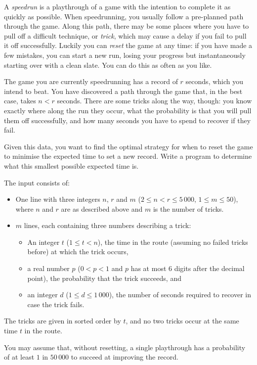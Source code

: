 
A \emph{speedrun} is a playthrough of a game with the intention to complete it as
quickly as possible. When speedrunning, you usually follow a pre-planned
path through the game. Along this path, there may be some places
where you have to pull off a difficult technique, or \emph{trick}, which may cause a
delay if you fail to pull it off successfully. Luckily you can \textit{reset}
the game at any time: if you have made a few mistakes, you can start a new run,
losing your progress but instantaneously starting over with a clean slate. You
can do this as often as you like.

The game you are currently speedrunning has a record of $r$ seconds, which you
intend to beat. You have discovered a path through the game that, in the best
case, takes $n < r$ seconds. There are some tricks along the way, though: you
know exactly where along the run they occur, what the probability is that you
will pull them off successfully, and how many seconds you have to spend to
recover if they fail.

Given this data, you want to find the optimal strategy for when to reset the
game to minimise the expected time to set a new record. Write a program
to determine what this smallest possible expected time is.

\begin{Input}
The input consists of:

\begin{itemize}
\item One line with three integers $n$, $r$ and $m$ ($2 \leq n < r \leq 5\,000$,
  $1 \le m \le 50$), where $n$ and $r$ are as described above and $m$ is the number of tricks.
\item $m$ lines, each containing three numbers describing a trick:
    \begin{itemize}
        \item An integer $t$ ($1 \le t < n$), the time in the route (assuming no failed tricks before) at which the trick occurs,
        \item a real number $p$ ($0 < p < 1$ and $p$ has at most $6$ digits after the decimal point), the probability that the trick succeeds, and
        \item an integer $d$ ($1 \le d \le 1\,000$), the number of seconds required to recover in case the trick fails.
    \end{itemize}
\end{itemize}

The tricks are given in sorted order by $t$, and no two tricks occur
at the same time $t$ in the route.

You may assume that, without resetting, a single playthrough has a probability
of at least $1$ in $50\,000$ to succeed at improving the record.
\end{Input}


